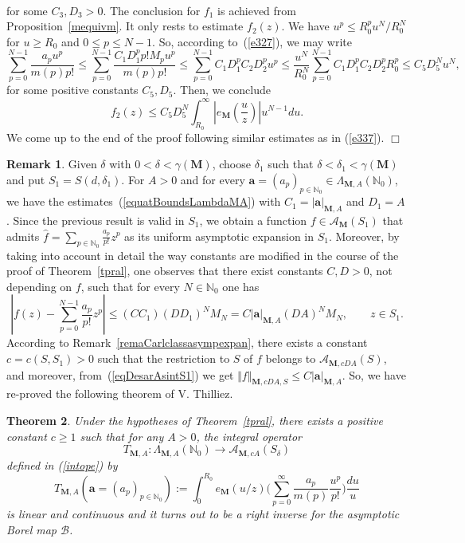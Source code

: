 \documentclass[11pt,a4paper,leqno]{article}
\theoremstyle{plain}
\newtheorem{theo}{Theorem}[section]
\theoremstyle{definition}
\newtheorem{rem}[theo]{Remark}
\newenvironment{proof1}{\medskip\par\noindent{\bf Proof}}{\hfill $\Box$
\medskip\par}
\def\N{\mathbb{N}}
\def\ba{\boldsymbol{a}}
\def\bM{\boldsymbol{M}}
\begin{document}
\begin{proof1}
\begin{multline}
\end{multline}
for some $C_3,D_3>0$. The conclusion for $f_1$ is achieved from Proposition~\ref{mequivm}.
It only rests to estimate $f_{2}(z)$. We have $u^p\le R_0^pu^N/R_0^N$ for $u\ge R_0$ and $0\le p\le N-1$. So, according to~(\ref{e327}), we may write
$$\sum_{p=0}^{N-1}\frac{a_pu^p}{m(p)p!}\le\sum_{p=0}^{N-1}\frac{C_1D_1^pp!M_pu^p}{m(p)p!} \le\sum_{p=0}^{N-1}C_1D_1^pC_2D_2^pu^p\le\frac{u^N}{R_0^N}\sum_{p=0}^{N-1}C_1D_1^pC_2D_2^pR_0^p\le C_5D_5^Nu^N,$$
for some positive constants $C_5,D_5$. Then, we conclude
$$f_2(z)\le C_5D^N_5\int_{R_0}^{\infty}\left|e_{\bM}\left(\frac{u}{z}\right)\right|u^{N-1}du.$$
We come up to the end of the proof following similar estimates as in (\ref{e337}).
\end{proof1}

\begin{rem}
Given $\delta$ with $0<\delta<\gamma(\bM)$, choose $\delta_1$ such that $\delta<\delta_1<\gamma(\bM)$ and put $S_1=S(d,\delta_1)$.
For $A>0$ and for every $\ba=(a_{p})_{p\in\N_0}\in\Lambda_{\bM,A}(\N_{0})$, we have the estimates~(\ref{equatBoundsLambdaMA}) with $C_1=|\ba|_{\bM,A}$ and $D_1=A$. Since the previous result is valid in $S_1$, we obtain a function $f\in\mathcal{A}_{\bM}(S_1)$ that admits $\hat{f}=\sum_{p\in\N_0}\frac{a_p}{p!}z^p$ as its uniform asymptotic expansion in $S_{1}$. Moreover,
by taking into account in detail the way constants are modified in the course of the proof of Theorem~\ref{tpral}, one observes that there exist constants $C,D>0$, not depending on $f$, such that for every $N\in\N_0$ one has
\begin{equation}\left|f(z)-\sum_{p=0}^{N-1}\frac{a_p}{p!}z^p \right|\le (CC_1)(DD_1)^NM_{N}=
C|\ba|_{\bM,A}(DA)^NM_N,\qquad z\in S_1.\label{eqDesarAsintS1}
\end{equation}
According to Remark~\ref{remaCarlclassasympexpan}, there exists a constant $c=c(S,S_1)>0$ such that the restriction to $S$ of $f$ belongs to $\mathcal{A}_{\bM,cDA}(S)$, and moreover, from~(\ref{eqDesarAsintS1}) we get $\Vert f\Vert_{\bM,cDA,S}\le C|\ba|_{\bM,A}$. So, we have re-proved the following theorem of V. Thilliez.
\end{rem}

\begin{theo}\label{corolpral}
Under the hypotheses of Theorem~\ref{tpral}, there exists a positive constant $c\ge1$ such that for any $A>0$, the integral operator
$$ T_{\bM,A}:\Lambda_{\bM,A}(\N_{0})\longrightarrow\mathcal{A}_{\bM,cA}(S_{\delta})$$
defined in (\ref{intope}) by
$$T_{\bM,A}(\ba=(a_{p})_{p\in\N_0}):=\int_{0}^{R_0}e_{\bM}(u/z) \Big(\sum_{p=0}^{\infty}\frac{a_{p}}{m(p)}\frac{u^p}{p!}\Big)\frac{du}{u}$$
is linear and continuous and it turns out to be a right inverse for the asymptotic Borel map $\mathcal{B}$.
\end{theo}
\end{document}
